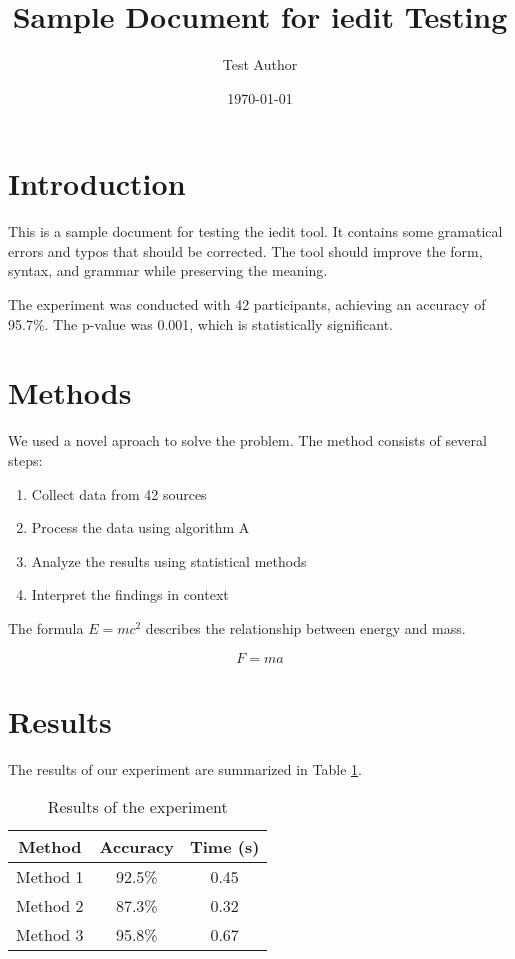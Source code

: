 \documentclass{article}
\title{Sample Document for iedit Testing}
\author{Test Author}
\date{\today}
\begin{document}
\maketitle

\section{Introduction}

This is a sample document for testing the iedit tool. It contains some gramatical errors and typos that should be corrected. The tool should improve the form, syntax, and grammar while preserving the meaning.

The experiment was conducted with 42 participants, achieving an accuracy of 95.7\%. The p-value was 0.001, which is statistically significant.

\section{Methods}

We used a novel aproach to solve the problem. The method consists of several steps:

\begin{enumerate}
    \item Collect data from 42 sources
    \item Process the data using algorithm A
    \item Analyze the results using statistical methods
    \item Interpret the findings in context
\end{enumerate}

The formula $E = mc^2$ describes the relationship between energy and mass.

\begin{equation}
F = ma
\end{equation}

\section{Results}

The results of our experiment are summarized in Table \ref{tab:results}.

\begin{table}
\centering
\caption{Results of the experiment}
\label{tab:results}
\begin{tabular}{|c|c|c|}
\hline
Method & Accuracy & Time (s) \\
\hline
Method 1 & 92.5\% & 0.45 \\
Method 2 & 87.3\% & 0.32 \\
Method 3 & 95.8\% & 0.67 \\
\hline
\end{tabular}
\end{table}
\end{document}
